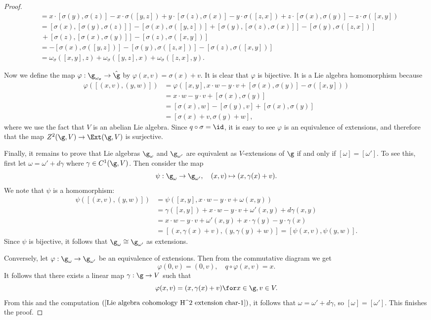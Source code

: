 \begin{proof}
\begin{align*}
&=x\cdot[\sigma(y),\sigma(z)]-x\cdot\sigma([y,z])+y\cdot[\sigma(z),\sigma(x)]-y\cdot\sigma([z,x])+z\cdot[\sigma(x),\sigma(y)]-z\cdot\sigma([x,y])\\
&=[\sigma(x),[\sigma(y),\sigma(z)]]-[\sigma(x),\sigma([y,z])]+[\sigma(y),[\sigma(z),\sigma(x)]]-[\sigma(y),\sigma([z,x])]\\
&\,+[\sigma(z),[\sigma(x),\sigma(y)]]-[\sigma(z),\sigma([x,y])]\\
&=-[\sigma(x),\sigma([y,z])]-[\sigma(y),\sigma([z,x])]-[\sigma(z),\sigma([x,y])]\\
&=\omega_\sigma([x,y],z)+\omega_\sigma([y,z],x)+\omega_\sigma([z,x],y).
\end{align*}

Now we define the map $\varphi:\g_{\omega_\sigma}\to\hat{\g}$ by $\varphi(x,v)=\sigma(x)+v$. It is clear that $\varphi$ is bijective. It is a Lie algebra homomorphism because
\begin{align*}
\varphi([(x,v),(y,w)])&=\varphi([x,y],x\cdot w-y\cdot v+[\sigma(x),\sigma(y)]-\sigma([x,y]))\\
&=x\cdot w-y\cdot v+[\sigma(x),\sigma(y)]\\
&=[\sigma(x),w]-[\sigma(y),v]+[\sigma(x),\sigma(y)]\\
&=[\sigma(x)+v,\sigma(y)+w],
\end{align*}
where we use the fact that $V$ is an abelian Lie algebra. Since $q\circ\sigma=\id$, it is easy to see $\varphi$ is an equivalence of extensions, and therefore that the map $Z^2(\g,V)\to\Ext(\g,V)$ is surjective.\par
Finally, it remains to prove that Lie algebras $\g_\omega$ and $\g_{\omega'}$ are equivalent as $V$-extensions of $\g$ if and only if $[\omega]=[\omega']$. To see this, first let $\omega=\omega'+d\gamma$ where $\gamma\in C^1(\g,V)$. Then consider the map
\[\psi:\g_\omega\to\g_{\omega'},\quad (x,v)\mapsto(x,\gamma(x)+v).\]
We note that $\psi$ is a homomorphism:
\begin{equation}
\begin{aligned}\label{Lie algebra cohomology H^2 extension char-1}
\psi([(x,v),(y,w)])&=\psi([x,y],x\cdot w-y\cdot v+\omega(x,y))\\
&=\gamma([x,y])+x\cdot w-y\cdot v+\omega'(x,y)+d\gamma(x,y)\\
&=x\cdot w-y\cdot v+\omega'(x,y)+x\cdot\gamma(y)-y\cdot\gamma(x)\\
&=[(x,\gamma(x)+v),(y,\gamma(y)+w)]=[\psi(x,v),\psi(y,w)].
\end{aligned}
\end{equation}
Since $\psi$ is bijective, it follows that $\g_\omega\cong\g_{\omega'}$ as extensions.\par
Conversely, let $\varphi:\g_{\omega}\to\g_{\omega'}$ be an equivalence of extensions. Then from the commutative diagram we get
\[\varphi(0,v)=(0,v),\quad q\circ\varphi(x,v)=x.\]
It follows that there exists a linear map $\gamma:\g\to V$ such that
\[\varphi(x,v)=(x,\gamma(x)+v)\for x\in\g,v\in V.\]
From this and the computation $(\ref{Lie algebra cohomology H^2 extension char-1})$, it follows that $\omega=\omega'+d\gamma$, so $[\omega]=[\omega']$. This finishes the proof.
\end{proof}
